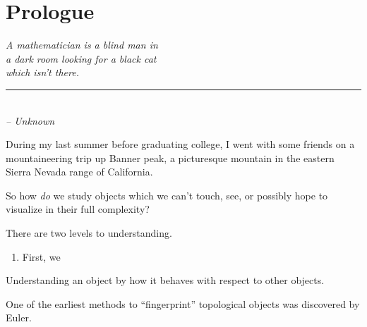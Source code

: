 \chapter*{Prologue}

\begin{flushleft}
	\textsl{A mathematician is a blind man in }\\
	\textsl{a dark room looking for a black cat}\\
	\textsl{which isn’t there.}\\
	\rule[0pt]{15em}{0.5pt}\\
	\textsl{-- Unknown}
\end{flushleft}

\vspace{2em}

During my last summer before graduating college, I went with some friends on a mountaineering trip up Banner peak, a picturesque mountain in the eastern Sierra Nevada range of California. 

So how \emph{do} we study objects which we can't touch, see, or possibly hope to visualize in their full complexity?

There are two levels to understanding.
\begin{enumerate}
	\item First, we
\end{enumerate}

Understanding an object by how it behaves with respect to other objects.

One of the earliest methods to ``fingerprint'' topological objects was discovered by Euler.
